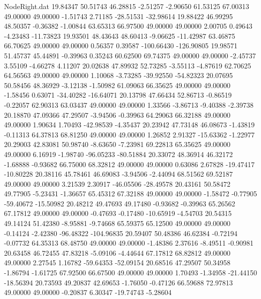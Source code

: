 \begin{filecontents}{NodeRight.dat}
  19.84347   50.51743   46.28815    -2.51257   -2.90650   61.53125   67.00313   49.00000   49.00000   -1.51743    2.71185  -28.51531  -32.98614
  19.88422   46.99295   48.50357    -0.36382   -1.00844   63.65313   66.97500   49.00000   49.00000    2.00705    0.49643   -4.23483  -11.73823
  19.93501   48.43643   48.60413    -9.06625  -11.42987   63.46875   66.70625   49.00000   49.00000    0.56357    0.39587 -100.66430 -126.90805
  19.98571   51.45737   45.44891    -0.39963    0.35243   60.62500   69.74375   49.00000   49.00000   -2.45737    3.55109   -4.66278    4.11207
  20.02638   47.89932   52.73285    -3.55113   -4.87619   62.70625   64.56563   49.00000   49.00000    1.10068   -3.73285  -39.92550  -54.82323
  20.07695   50.58456   48.36929    -3.12138   -1.50982   61.09063   66.35625   49.00000   49.00000   -1.58456    0.63071  -34.40282  -16.64071
  20.13798   47.66434   52.86713    -0.86519   -0.22057   62.90313   63.03437   49.00000   49.00000    1.33566   -3.86713   -9.40388   -2.39738
  20.18870   47.09366   47.29507    -3.94506   -0.39963   64.29063   66.32188   49.00000   49.00000    1.90634    1.70493  -42.98539   -4.35437
  20.23942   47.73148   46.08673    -1.43819   -0.11313   64.37813   68.81250   49.00000   49.00000    1.26852    2.91327  -15.63362   -1.22977
  20.29003   42.83081   50.98740    -8.63650   -7.23981   69.22813   65.35625   49.00000   49.00000    6.16919   -1.98740  -96.05233  -80.51884
  20.33072   48.36914   46.32172    -1.68888   -0.93682   66.75000   68.32812   49.00000   49.00000    0.63086    2.67828  -19.47417  -10.80228
  20.38116   45.78461   46.69083    -3.94506   -2.44094   68.51562   69.52187   49.00000   49.00000    3.21539    2.30917  -46.05506  -28.49578
  20.43161   50.58472   49.77905    -5.23431   -1.36657   65.45312   67.32188   49.00000   49.00000   -1.58472   -0.77905  -59.40672  -15.50982
  20.48212   49.47693   49.17480    -0.93682   -0.39963   65.26562   67.17812   49.00000   49.00000   -0.47693   -0.17480  -10.65919   -4.54703
  20.54315   49.14124   51.42380    -8.95881   -9.74668   65.59375   65.12500   49.00000   49.00000   -0.14124   -2.42380  -96.48322 -104.96835
  20.59407   50.48386   46.62384    -0.72194   -0.07732   64.35313   68.48750   49.00000   49.00000   -1.48386    2.37616   -8.49511   -0.90981
  20.63458   46.72455   47.83218    -5.09106   -4.44644   67.17812   68.82812   49.00000   49.00000    2.27545    1.16782  -59.64353  -52.09154
  20.68516   47.29507   50.34958    -1.86794   -1.61725   67.92500   66.67500   49.00000   49.00000    1.70493   -1.34958  -21.44150  -18.56394
  20.73593   49.20837   42.69653    -1.76050   -0.47126   66.59688   72.97813   49.00000   49.00000   -0.20837    6.30347  -19.74743   -5.28604

\end{filecontents}
